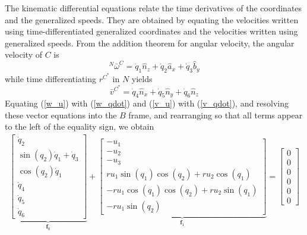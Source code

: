 \documentclass[smallcondensed,final]{svjour3}                     %
\begin{document}
The kinematic differential equations relate the time derivatives of the
coordinates and the generalized speeds. They are obtained by equating the
velocities written using time-differentiated generalized coordinates and the
velocities written using generalized speeds. From the addition theorem for
angular velocity, the angular velocity of $C$ is
\begin{equation}
  \label{w_qdot}
  {^N}\bar{\omega}^C = \dot{q}_1 \hat{n}_z + \dot{q}_2 \hat{a}_x + \dot{q}_3 \hat{b}_y
\end{equation}
while time differentiating $r^{C^*}$ in $N$ yields
\begin{equation}
  \label{v_qdot}
  \bar{v}^{C^*} = \dot{q}_4 \hat{n}_x + \dot{q}_5 \hat{n}_y + \dot{q}_6 \hat{n}_z
\end{equation}
Equating (\ref{w_u}) with (\ref{w_qdot}) and (\ref{v_u}) with (\ref{v_qdot}),
and resolving these vector equations into the $B$ frame, and rearranging so
that all terms appear to the left of the equality sign, we obtain
\begin{align}
    \label{rd:f_0_f_1}
\underbrace{\left[\begin{matrix}\dot{q}_{2}\\\sin\left(q_{2}\right)
    \dot{q}_{1} + \dot{q}_{3}\\\cos\left(q_{2}\right)
    \dot{q}_{1}\\\dot{q}_{4}\\\dot{q}_{5}\\\dot{q}_{6}\end{matrix}\right]}_{\mathbf{f}_0}
    + 
\underbrace{\left[\begin{matrix}- u_{1}\\- u_{2}\\- u_{3}\\r u_{1}
    \sin\left(q_{1}\right) \cos\left(q_{2}\right) +
    r u_{2} \cos\left(q_{1}\right)\\- r u_{1}
    \cos\left(q_{1}\right) \cos\left(q_{2}\right) +
    r u_{2} \sin\left(q_{1}\right)\\- r u_{1}
    \sin\left(q_{2}\right)\end{matrix}\right]}_{\mathbf{f}_1}
    = \left[\begin{matrix} 0\\ 0\\ 0\\ 0\\ 0\\ 0\end{matrix}\right]
\end{align}
\end{document}
